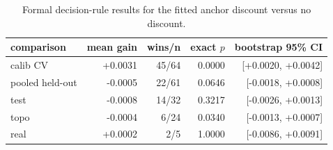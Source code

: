 \begin{table}[t]
\centering
\small
\caption{Formal decision-rule results for the fitted anchor discount versus no discount.}
\label{tab:v2anchor}
\begin{tabular}{@{}lrrrr@{}}\toprule
comparison & mean gain & wins/n & exact $p$ & bootstrap 95\% CI \\
\midrule
calib CV & +0.0031 & 45/64 & 0.0000 & [+0.0020, +0.0042] \\
pooled held-out & -0.0005 & 22/61 & 0.0646 & [-0.0018, +0.0008] \\
test & -0.0008 & 14/32 & 0.3217 & [-0.0026, +0.0013] \\
topo & -0.0004 & 6/24 & 0.0340 & [-0.0013, +0.0007] \\
real & +0.0002 & 2/5 & 1.0000 & [-0.0086, +0.0091] \\
\bottomrule\end{tabular}
\end{table}
